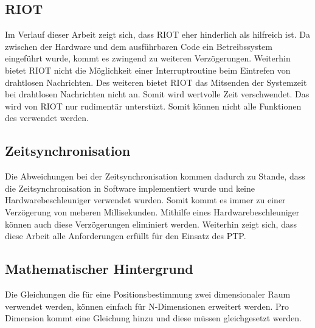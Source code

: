 \subsection{RIOT}
Im Verlauf dieser Arbeit zeigt sich, dass RIOT eher hinderlich als hilfreich ist. Da zwischen der Hardware und dem ausführbaren Code ein Betreibssystem eingeführt wurde, kommt es zwingend zu weiteren Verzögerungen. Weiterhin bietet RIOT nicht die Möglichkeit einer Interruptroutine beim Eintrefen von drahtlosen Nachrichten. Des weiteren bietet RIOT das Mitsenden der Systemzeit bei drahtlosen Nachrichten nicht an. Somit wird wertvolle Zeit verschwendet. Das \board \platz wird von RIOT nur rudimentär unterstüzt. Somit können nicht alle Funktionen des \board \platz verwendet werden.

\subsection{Zeitsynchronisation}
Die Abweichungen bei der Zeitsynchronisation kommen dadurch zu Stande, dass die Zeitsynchronisation in Software implementiert wurde und keine Hardwarebeschleuniger verwendet wurden. Somit kommt es immer zu einer Verzögerung von meheren Millisekunden. Mithilfe eines Hardwarebeschleuniger können auch diese Verzögerungen eliminiert werden. Weiterhin zeigt sich, dass diese Arbeit alle Anforderungen erfüllt für den Einsatz des PTP.

\subsection{Mathematischer Hintergrund}
Die Gleichungen die für eine Positionsbestimmung zwei dimensionaler Raum verwendet werden, können einfach für \si{N}-Dimensionen erweitert werden. Pro Dimension kommt eine Gleichung hinzu und diese müssen gleichgesetzt werden. 















